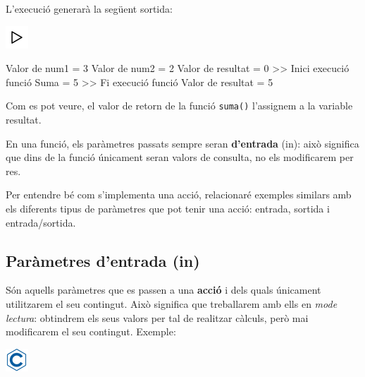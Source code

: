 \documentclass[]{book}
\newenvironment{Shaded}{\begin{snugshade}}{\end{snugshade}}
\newcommand{\DecValTok}[1]{\textcolor[rgb]{0.00,0.00,0.81}{#1}}
\newcommand{\NormalTok}[1]{#1}
\begin{document}
L'execució generarà la següent sortida:

\includegraphics{./img/play.png}

\begin{Shaded}
\begin{Highlighting}[]
\NormalTok{Valor de num1 = }\DecValTok{3}
\NormalTok{Valor de num2 = }\DecValTok{2}
\NormalTok{Valor de resultat = }\DecValTok{0}
\NormalTok{>> Inici execució funció}
\NormalTok{Suma = }\DecValTok{5}
\NormalTok{>> Fi execució funció}
\NormalTok{Valor de resultat = }\DecValTok{5}
\end{Highlighting}
\end{Shaded}

Com es pot veure, el valor de retorn de la funció \texttt{suma()}
l'assignem a la variable resultat.

En una funció, els paràmetres passats sempre seran \textbf{d'entrada}
(in): això significa que dins de la funció únicament seran valors de
consulta, no els modificarem per res.

Per entendre bé com s'implementa una acció, relacionaré exemples
similars amb els diferents tipus de paràmetres que pot tenir una acció:
entrada, sortida i entrada/sortida.

\subsection{Paràmetres d'entrada (in)}\label{parametres-dentrada-in}

Són aquells paràmetres que es passen a una \textbf{acció} i dels quals
únicament utilitzarem el seu contingut. Això significa que treballarem
amb ells en \emph{mode lectura}: obtindrem els seus valors per tal de
realitzar càlculs, però mai modificarem el seu contingut. Exemple:

\includegraphics{./img/c.png}
\end{document}
